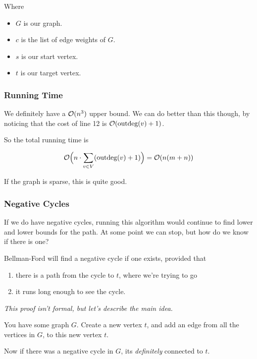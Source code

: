 \documentclass[12pt]{article}
\begin{document}
  Where

  \begin{itemize}
    \item $G$ is our graph.
    \item $c$ is the list of edge weights of $G$.
    \item $s$ is our start vertex.
    \item $t$ is our target vertex.
  \end{itemize}


  \subsubsection{Running Time}

  We definitely have a $\mathcal O(n^3)$ upper bound. We can do better than this though,
  by noticing that the cost of line 12 is $\mathcal O(\text{outdeg}(v) + 1)$.

  So the total running time is

  \[
    \mathcal O\Big(n \cdot \sum_{v \in V} (\text{outdeg}(v) + 1)\Big) = \mathcal O(n(m + n))
  \]

  If the graph is sparse, this is quite good.

  \subsubsection{Negative Cycles}

  If we do have negative cycles, running this algorithm would continue to find
  lower and lower bounds for the path. At some point we can stop, but how do we
  know if there is one?

  Bellman-Ford will find a negative cycle if one exists, provided that

  \begin{enumerate}
    \item there is a path from the cycle to $t$, where we're trying to go
    \item it runs long enough to see the cycle.


  \end{enumerate}

  {
    {\it This proof isn't formal, but let's describe the main idea.}

    You have some graph $G$. Create a new vertex $t$, and add an edge from all
    the vertices in $G$, to this new vertex $t$.

    Now if there was a negative cycle in $G$, its {\it definitely} connected to
    $t$.
  }
\end{document}
